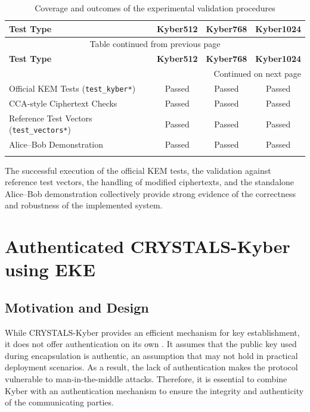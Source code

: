 \documentclass[12pt]{article}
\begin{document}
\begin{footnotesize}
\begin{longtable}{|l|c|c|c|}
\hline
\textbf{Test Type} & \textbf{Kyber512} & \textbf{Kyber768} & \textbf{Kyber1024} \\ \hline
\endfirsthead

\multicolumn{4}{c}{{Table \thetable{} continued from previous page}} \\ \hline
\textbf{Test Type} & \textbf{Kyber512} & \textbf{Kyber768} & \textbf{Kyber1024} \\ \hline
\endhead

\hline \multicolumn{4}{r}{{Continued on next page}} \\ \endfoot
\hline
\endlastfoot

Official KEM Tests (\texttt{test\_kyber*}) & Passed & Passed & Passed \\ \hline
CCA-style Ciphertext Checks              & Passed & Passed & Passed \\ \hline
Reference Test Vectors (\texttt{test\_vectors*}) & Passed & Passed & Passed \\ \hline
Alice--Bob Demonstration                 & Passed & Passed & Passed \\ \hline

\caption{Coverage and outcomes of the experimental validation procedures}
\label{tab:kyber_test_coverage}
\end{longtable}
\end{footnotesize}

The successful execution of the official KEM tests, the validation against reference test vectors, the handling of modified ciphertexts, and the standalone Alice–Bob demonstration collectively provide strong evidence of the correctness and robustness of the implemented system.

\newpage


\section{Authenticated CRYSTALS-Kyber using EKE}

\subsection{Motivation and Design}

While CRYSTALS-Kyber provides an efficient mechanism for key establishment, it does not offer authentication on its own \cite{kyberspec}. It assumes that the public key used during encapsulation is authentic, an assumption that may not hold in practical deployment scenarios. As a result, the lack of authentication makes the protocol vulnerable to man-in-the-middle attacks. Therefore, it is essential to combine Kyber with an authentication mechanism to ensure the integrity and authenticity of the communicating parties.
\end{document}
